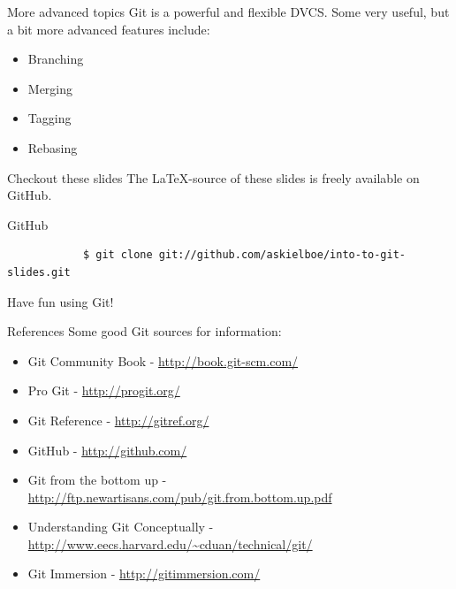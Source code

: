 \documentclass{beamer}
\begin{document}
\begin{frame}[fragile]{More advanced topics}
	Git is a powerful and flexible DVCS. Some very useful, but a bit more advanced features include:
	\begin{itemize}
		\item Branching
		\item Merging
		\item Tagging
		\item Rebasing
	\end{itemize}
\end{frame}

\begin{frame}[fragile]{Checkout these slides}
	The \LaTeX-source of these slides is freely available on GitHub.
	\begin{exampleblock}{GitHub}
		\begin{footnotesize} \begin{verbatim}
			$ git clone git://github.com/askielboe/into-to-git-slides.git
		\end{verbatim} \end{footnotesize}
	\end{exampleblock}
	\vskip45pt
	\begin{center}
		Have fun using Git!
	\end{center}
\end{frame}

\begin{frame}[fragile]{References}
	Some good Git sources for information:
	\begin{itemize}
		\item Git Community Book - \url{http://book.git-scm.com/}
		\item Pro Git - \url{http://progit.org/}	
		\item Git Reference - \url{http://gitref.org/}
		\item GitHub - \url{http://github.com/}
		\item Git from the bottom up - \url{http://ftp.newartisans.com/pub/git.from.bottom.up.pdf}
		\item Understanding Git Conceptually - \url{http://www.eecs.harvard.edu/~cduan/technical/git/}
		\item Git Immersion - \url{http://gitimmersion.com/}
	\end{itemize}
\end{frame}
\end{document}
